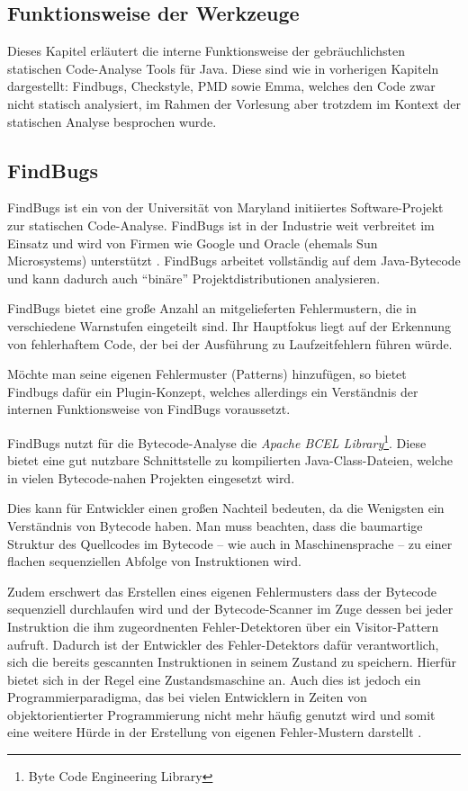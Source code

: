 \begin{flushleft}
\section{Funktionsweise der Werkzeuge}
\end{flushleft}
Dieses Kapitel erläutert die interne Funktionsweise der gebräuchlichsten statischen Code-Analyse Tools für Java. Diese sind wie in vorherigen Kapiteln dargestellt: Findbugs, Checkstyle, PMD sowie Emma, welches den Code zwar nicht statisch analysiert, im Rahmen der Vorlesung aber trotzdem im Kontext der statischen Analyse besprochen wurde.


\subsection{FindBugs}

FindBugs ist ein von der Universität von Maryland initiiertes Software-Projekt zur statischen Code-Analyse. FindBugs ist in der Industrie weit verbreitet im Einsatz und wird von Firmen wie Google und Oracle (ehemals Sun Microsystems) unterstützt \citep{findbugsUser}.
FindBugs arbeitet vollständig auf dem Java-Bytecode und kann dadurch auch ``binäre'' Projektdistributionen analysieren. 

FindBugs bietet eine große Anzahl an mitgelieferten Fehlermustern, die in verschiedene Warnstufen eingeteilt sind. Ihr Hauptfokus liegt auf der Erkennung von fehlerhaftem Code, der bei der Ausführung zu Laufzeitfehlern führen würde.

Möchte man seine eigenen Fehlermuster (Patterns) hinzufügen, so bietet Findbugs dafür ein Plugin-Konzept, welches allerdings ein Verständnis der internen Funktionsweise von FindBugs voraussetzt.
 
FindBugs nutzt für die Bytecode-Analyse die \textit{Apache BCEL Library}\footnote{Byte Code Engineering Library}. Diese bietet eine gut nutzbare Schnittstelle zu kompilierten Java-Class-Dateien, welche in vielen Bytecode-nahen Projekten eingesetzt wird. %

Dies kann für Entwickler einen großen Nachteil bedeuten, da die Wenigsten ein Verständnis von Bytecode haben. Man muss beachten, dass die baumartige Struktur des Quellcodes im Bytecode -- wie auch in Maschinensprache -- zu einer flachen sequenziellen Abfolge von Instruktionen wird. 

Zudem erschwert das Erstellen eines eigenen Fehlermusters dass der Bytecode sequenziell durchlaufen wird und der Bytecode-Scanner im Zuge dessen bei jeder Instruktion die ihm zugeordnenten Fehler-Detektoren über ein Visitor-Pattern aufruft. 
Dadurch ist der Entwickler des Fehler-Detektors dafür verantwortlich, sich die bereits gescannten Instruktionen in seinem Zustand zu speichern. Hierfür bietet sich in der Regel eine Zustandsmaschine an. Auch dies ist jedoch ein Programmierparadigma, das bei vielen Entwicklern in Zeiten von objektorientierter Programmierung nicht mehr häufig genutzt wird und somit eine weitere Hürde in der Erstellung von eigenen Fehler-Mustern darstellt \citep{findbugsDetector}.

